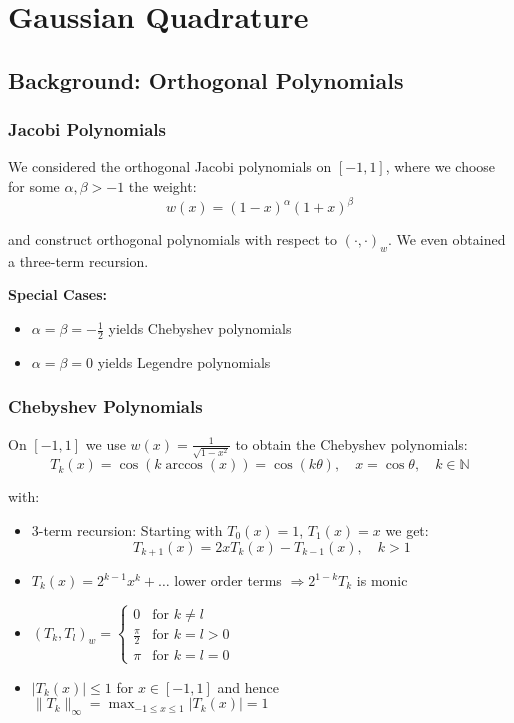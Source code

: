 \chapter{Gaussian Quadrature}
\label{ch:gaussian-quadrature}

\section{Background: Orthogonal Polynomials}

\subsection{Jacobi Polynomials}

We considered the orthogonal Jacobi polynomials on $[-1,1]$, where we choose for some $\alpha, \beta > -1$ the weight:
\[w(x) = (1-x)^{\alpha}(1+x)^{\beta}\]

and construct orthogonal polynomials with respect to $(\cdot, \cdot)_w$. We even obtained a three-term recursion.

\textbf{Special Cases:}
\begin{itemize}
    \item $\alpha = \beta = -\frac{1}{2}$ yields Chebyshev polynomials
    \item $\alpha = \beta = 0$ yields Legendre polynomials
\end{itemize}

\subsection{Chebyshev Polynomials}

On $[-1,1]$ we use $w(x) = \frac{1}{\sqrt{1-x^2}}$ to obtain the Chebyshev polynomials:
\[T_k(x) = \cos(k \arccos(x)) = \cos(k\theta), \quad x = \cos \theta, \quad k \in \mathbb{N}\]

with:
\begin{itemize}
    \item 3-term recursion: Starting with $T_0(x) = 1$, $T_1(x) = x$ we get:
          \[T_{k+1}(x) = 2xT_k(x) - T_{k-1}(x), \quad k > 1\]

    \item $T_k(x) = 2^{k-1}x^k + \ldots$ lower order terms $\Rightarrow 2^{1-k}T_k$ is monic

    \item $(T_k, T_l)_w = \begin{cases}
                  0             & \text{for } k \neq l  \\
                  \frac{\pi}{2} & \text{for } k = l > 0 \\
                  \pi           & \text{for } k = l = 0
              \end{cases}$

    \item $|T_k(x)| \leq 1$ for $x \in [-1,1]$ and hence $\|T_k\|_{\infty} = \max_{-1 \leq x \leq 1} |T_k(x)| = 1$
\end{itemize}

